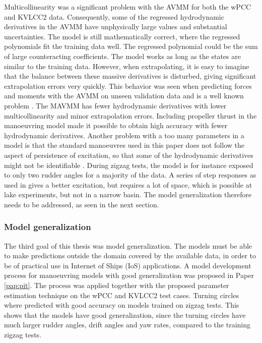 Multicollinearity was a significant problem with the AVMM for both the wPCC and KVLCC2 data. Consequently, some of the regressed hydrodynamic derivatives in the AVMM have unphysically large values and substantial uncertainties. The model is still mathematically correct, where the regressed polynomials fit the training data well. The regressed polynomial could be the sum of large counteracting coefficients. The model works as long as the states are similar to the training data. However, when extrapolating, it is easy to imagine that the balance between these massive derivatives is disturbed, giving significant extrapolation errors very quickly. This behavior was seen when predicting forces and moments with the AVMM on unseen validation data and is a well known problem \cite{ittc_maneuvering_2008}.
The MAVMM has fewer hydrodynamic derivatives with lower multicollinearity and minor extrapolation errors. Including propeller thrust in the manoeuvring model made it possible to obtain high accuracy with fewer hydrodynamic derivatives. Another problem with a too many parameters in a model is that the standard manoeuvres used in this paper does not follow the aspect of persistence of excitation, so that some of the hydrodynamic derivatives might not be identifiable \cite{revestido_herrero_two-step_2012}. During zigzag tests, the model is for instance exposed to only two rudder angles for a majority of the data. A series of step responses as used in \cite{miller_ship_2021} gives a better excitation, but requires a lot of space, which is possible at lake experiments, but not in a narrow basin. The model generalization therefore needs to be addressed, as seen in the next section.

\subsubsection*{Model generalization} 
The third goal of this thesis was model generalization. The models must be able to make predictions outside the domain covered by the available data, in order to be of practical use in Internet of Ships (IoS) applications. A model development process for manoeuvring models with good generalization was proposed in Paper \ref{pap:pit}.
The process was applied together with the proposed parameter estimation technique on the wPCC and KVLCC2 test cases. Turning circles where predicted with good accuracy on models trained on zigzag tests. This shows that the models have good generalization, since the turning circles have much larger rudder angles, drift angles and yaw rates, compared to the training zigzag tests. 
